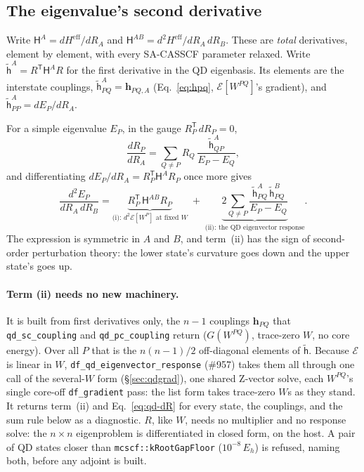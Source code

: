 \documentclass[11pt]{article}
\newcommand{\code}[1]{\texttt{#1}}
\newcommand{\Heff}{H^{\mathrm{eff}}}
\newcommand{\T}{\mathsf T}
\begin{document}
\subsection{The eigenvalue's second derivative}
\label{sec:qd-eig}

Write $\mathsf H^A = d\Heff/dR_A$ and $\mathsf H^{AB} = d^2\Heff/dR_A\,dR_B$.
These are \emph{total} derivatives, element by element, with every
SA-CASSCF parameter relaxed. Write $\tilde{\mathsf h}^A = R^\T\mathsf H^A R$
for the first derivative in the QD eigenbasis. Its elements are the
interstate couplings, $\tilde{\mathsf h}^A_{PQ} = \mathbf h_{PQ,A}$
(Eq.~\eqref{eq:hpq}, $\mathcal E[W^{PQ}]$'s gradient), and
$\tilde{\mathsf h}^A_{PP} = dE_P/dR_A$.

For a simple eigenvalue $E_P$, in the gauge $R_P^\T\,dR_P = 0$,
\begin{equation}
  \frac{dR_P}{dR_A} = \sum_{Q\neq P} R_Q\,\frac{\tilde{\mathsf h}^A_{QP}}{E_P - E_Q},
  \label{eq:qd-dR}
\end{equation}
and differentiating $dE_P/dR_A = R_P^\T\mathsf H^A R_P$ once more gives
\begin{equation}
\boxed{\;
  \frac{d^2E_P}{dR_A\,dR_B}
  = \underbrace{R_P^\T\,\mathsf H^{AB}R_P}_{\text{(i): }d^2\mathcal E[W^P]\text{ at fixed }W}
  \;+\; \underbrace{2\sum_{Q\neq P}\frac{\tilde{\mathsf h}^A_{PQ}\,\tilde{\mathsf h}^B_{PQ}}{E_P - E_Q}}_{\text{(ii): the QD eigenvector response}}.\;}
  \label{eq:qd-hess}
\end{equation}
The expression is symmetric in $A$ and $B$, and term~(ii) has the sign of
second-order perturbation theory: the lower state's curvature goes down
and the upper state's goes up.

\paragraph{Term (ii) needs no new machinery.} It is built from first
derivatives only, the $n-1$ couplings $\mathbf h_{PQ}$ that
\code{qd\_sc\_coupling} and \code{qd\_pc\_coupling} return ($G(W^{PQ})$,
trace-zero $W$, no core energy). Over all $P$ that is the $n(n-1)/2$
off-diagonal elements of $\tilde{\mathsf h}$. Because $\mathcal E$ is
linear in $W$, \code{df\_qd\_eigenvector\_response} (\#957) takes them all
through one call of the several-$W$ form (\S\ref{sec:qdgrad}), one shared
Z-vector solve, each $W^{PQ}$'s single core-off \code{df\_gradient} pass:
the list form takes trace-zero $W$s as they stand. It returns term~(ii) and
Eq.~\eqref{eq:qd-dR} for every state, the couplings, and the sum rule below
as a diagnostic. $R$, like $W$, needs no multiplier and no response solve:
the $n\times n$ eigenproblem is differentiated in closed form, on the host.
A pair of QD states closer than \code{mcscf::kRootGapFloor}
($10^{-8}\,E_h$) is refused, naming both, before any adjoint is built.
\end{document}

